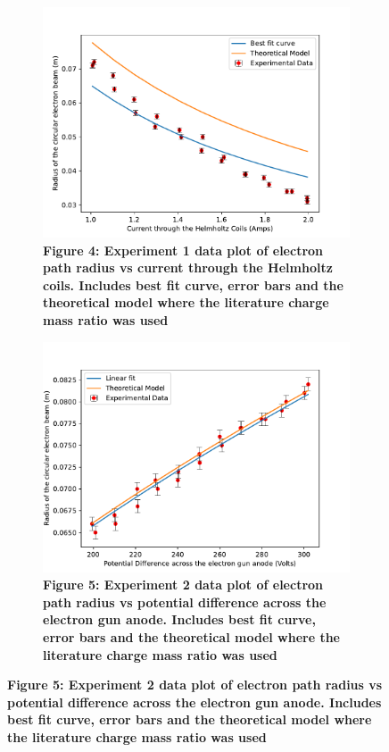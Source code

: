 \documentclass[
	letterpaper, %
	10pt, %
]{CSUniSchoolLabReport}
\begin{document}
\begin{figure}[H]
	\begin{subfigure}{0.45\textwidth}
		\includegraphics[width=\textwidth]{../figures/variedCurrentGraph.pdf}
		\caption{\textbf{Figure 4: Experiment 1 data plot of electron path radius vs current through the Helmholtz coils. Includes best fit curve, error bars and the theoretical model where the literature charge mass ratio was used}}
	\end{subfigure}
	\hspace*{\fill}
	\begin{subfigure}{0.45\textwidth}
		\includegraphics[width=\textwidth]{../figures/variedVoltageGraph.pdf}
		\caption{\textbf{Figure 5: Experiment 2 data plot of electron path radius vs potential difference across the electron gun anode. Includes best fit curve, error bars and the theoretical model where the literature charge mass ratio was used}}

\end{subfigure}
\end{figure}
\end{document}
